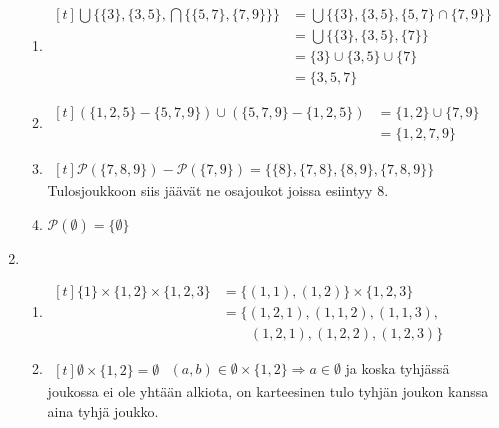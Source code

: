 \documentclass[a4paper,11pt,draft]{article}
\begin{document}
\begin{enumerate}
\begin{enumerate}
  \item
    \begin{math}
      \begin{aligned}[t]
        \bigcup\{\{3\},\{3,5\},\bigcap\{\{5,7\},\{7,9\}\}\}
        &= \bigcup\{\{3\},\{3,5\},\{5,7\} \cap \{7,9\}\} \\
        &= \bigcup\{\{3\},\{3,5\},\{7\}\} \\
        &= \{3\} \cup \{3,5\} \cup \{7\} \\
        &= \{3,5,7\}
      \end{aligned}
    \end{math}

  \item
    \begin{math}
      \begin{aligned}[t]
        (\{1,2,5\} - \{5,7,9\}) \cup (\{5,7,9\} - \{1,2,5\})
        &= \{1,2\} \cup \{7,9\} \\
        &= \{1,2,7,9\}
      \end{aligned}
    \end{math}

  \item
    \begin{math}
      \begin{aligned}[t]
        \mathcal{P}(\{7,8,9\}) - \mathcal{P}(\{7,9\})
        = \{\{8\}, \{7,8\}, \{8,9\}, \{7,8,9\}\}
      \end{aligned}
    \end{math} \\
    Tulosjoukkoon siis jäävät ne osajoukot joissa esiintyy 8.
  \item
    $\mathcal{P}(\emptyset) = \{\emptyset\}$
  \end{enumerate}

\item
  \begin{enumerate}
  \item
    \begin{math}
      \begin{aligned}[t]
        \{1\} \times \{1,2\} \times \{1,2,3\}
        &= \{(1,1), (1,2)\} \times \{1,2,3\} \\
        &= \{(1,2,1), (1,1,2), (1,1,3),\\
        &\qquad(1,2,1), (1,2,2), (1,2,3)\}
      \end{aligned}
    \end{math}

  \item
    \begin{math}
      \begin{aligned}[t]
        \emptyset \times \{1,2\} = \emptyset
      \end{aligned}
    \end{math}
    $(a,b) \in \emptyset \times \{1,2\} \Rightarrow a \in \emptyset$
    ja koska tyhjässä joukossa ei ole yhtään alkiota, on karteesinen
    tulo tyhjän joukon kanssa aina tyhjä joukko.


\end{enumerate}
\end{enumerate}
\end{document}
